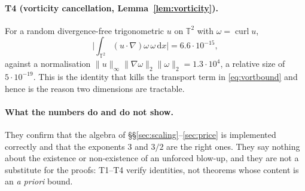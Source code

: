\documentclass[11pt]{article}
\theoremstyle{remark}
\newcommand{\T}{\mathbb{T}}
\newcommand{\dd}{\,\mathrm{d}}
\newcommand{\norm}[1]{\lVert #1\rVert}
\newcommand{\abs}[1]{\lvert #1\rvert}
\newcommand{\curl}{\operatorname{curl}}
\begin{document}
\paragraph{T4 (vorticity cancellation, Lemma~\ref{lem:vorticity}).}
For a random divergence-free trigonometric $u$ on $\T^2$ with $\omega=\curl u$,
\[
\abs{\int_{\T^2}(u\cdot\nabla)\omega\,\omega\dd x}=6.6\cdot10^{-15},
\]
against a normalisation $\norm{u}_\infty\norm{\nabla\omega}_2\norm{\omega}_2=1.3\cdot10^{4}$,
a relative size of $5\cdot10^{-19}$. This is the identity that kills the transport term in
\eqref{eq:vortbound} and hence is the reason two dimensions are tractable.

\paragraph{What the numbers do and do not show.}
They confirm that the algebra of \S\S\ref{sec:scaling}--\ref{sec:price} is implemented
correctly and that the exponents $3$ and $3/2$ are the right ones. They say nothing about the
existence or non-existence of an unforced blow-up, and they are not a substitute for the
proofs: T1--T4 verify identities, not theorems whose content is an \emph{a priori} bound.
\end{document}
